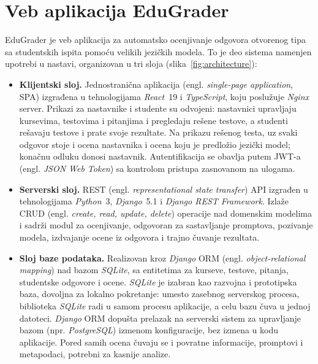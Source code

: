 \chapter{Veb aplikacija EduGrader}
\label{sec:aplikacija}

EduGrader je veb aplikacija za automatsko ocenjivanje odgovora otvorenog tipa sa studentskih ispita pomoću velikih jezičkih modela.
To je deo sistema namenjen upotrebi u nastavi, organizovan u tri sloja (slika~\ref{fig:architecture}):

\begin{itemize}
    \item \textbf{Klijentski sloj.} Jednostranična aplikacija (engl. \emph{single-page application}, SPA)
    izgrađena u tehnologijama \emph{React}~19 i \emph{TypeScript}, koju poslužuje \emph{Nginx} server.
    Prikazi za nastavnike i studente su odvojeni: nastavnici upravljaju kursevima,
    testovima i pitanjima i pregledaju rešene testove, a studenti rešavaju testove i prate svoje rezultate.
    Na prikazu rešenog testa, uz svaki odgovor stoje i ocena nastavnika i ocena koju je predložio jezički model; konačnu odluku donosi nastavnik.
    Autentifikacija se obavlja putem JWT-a (engl. \emph{JSON Web Token}) sa kontrolom pristupa zasnovanom na ulogama.
    \item \textbf{Serverski sloj.} REST (engl. \emph{representational state transfer}) API izgrađen u tehnologijama \emph{Python}~3,
    \emph{Django}~5.1 i \emph{Django REST Framework}.
    Izlaže CRUD (engl. \emph{create, read, update, delete}) operacije nad domenskim modelima
    i sadrži modul za ocenjivanje, odgovoran za sastavljanje promptova, pozivanje modela,
    izdvajanje ocene iz odgovora i trajno čuvanje rezultata.
    \item \textbf{Sloj baze podataka.} Realizovan kroz \emph{Django} ORM (engl. \emph{object-relational mapping})
    nad bazom \emph{SQLite},
    sa entitetima za kurseve, testove, pitanja, studentske odgovore i ocene.
    \emph{SQLite} je izabran kao razvojna i prototipska baza, dovoljna za lokalno pokretanje:
    umesto zasebnog serverskog procesa, biblioteka \emph{SQLite} radi u samom procesu aplikacije,
    a celu bazu čuva u jednoj datoteci.
    \emph{Django} ORM dopušta prelazak na serverski sistem za upravljanje bazom (npr. \emph{PostgreSQL})
    izmenom konfiguracije, bez izmena u kodu aplikacije.
    Pored samih ocena čuvaju se i povratne informacije, promptovi i metapodaci, potrebni za kasnije analize.
\end{itemize}

